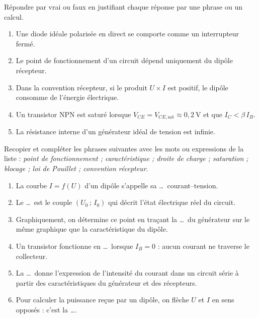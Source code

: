 \documentclass[11pt]{article}
\begin{document}
\begin{exercice}
Répondre par vrai ou faux en justifiant chaque réponse par une phrase ou un calcul.
\begin{enumerate}
\item Une diode idéale polarisée en direct se comporte comme un interrupteur fermé.
\item Le point de fonctionnement d'un circuit dépend uniquement du dipôle récepteur.
\item Dans la convention récepteur, si le produit $U \times I$ est positif, le dipôle consomme de l'énergie électrique.
\item Un transistor NPN est saturé lorsque $V_{CE} = V_{CE,\text{sat}} \approx 0{,}2~\text{V}$ et que $I_C < \beta\, I_B$.
\item La résistance interne d'un générateur idéal de tension est infinie.
\end{enumerate}
\end{exercice}

\begin{exercice}
Recopier et compléter les phrases suivantes avec les mots ou expressions de la liste : \emph{point de fonctionnement ; caractéristique ; droite de charge ; saturation ; blocage ; loi de Pouillet ; convention récepteur}.
\begin{enumerate}
\item La courbe $I = f(U)$ d'un dipôle s'appelle sa \ldots\ courant--tension.
\item Le \ldots\ est le couple $(U_0\,;\,I_0)$ qui décrit l'état électrique réel du circuit.
\item Graphiquement, on détermine ce point en traçant la \ldots\ du générateur sur le même graphique que la caractéristique du dipôle.
\item Un transistor fonctionne en \ldots\ lorsque $I_B = 0$ : aucun courant ne traverse le collecteur.
\item La \ldots\ donne l'expression de l'intensité du courant dans un circuit série à partir des caractéristiques du générateur et des récepteurs.
\item Pour calculer la puissance reçue par un dipôle, on flèche $U$ et $I$ en sens opposés : c'est la \ldots.
\end{enumerate}
\end{exercice}
\end{document}
